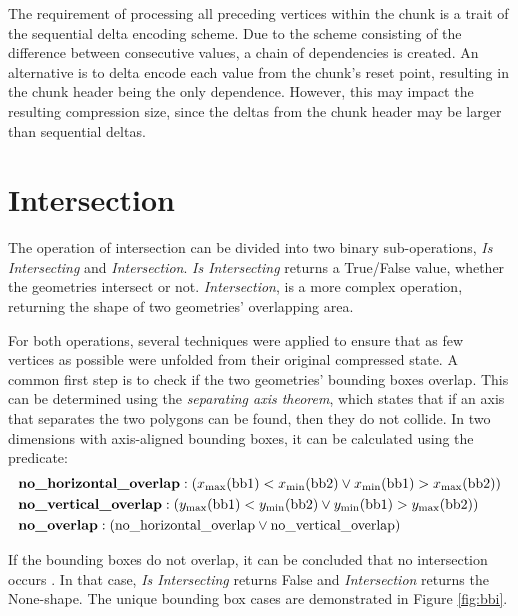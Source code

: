 The requirement of processing all preceding vertices within the chunk is a trait of the sequential delta encoding scheme. Due to the scheme consisting of the difference between consecutive values, a chain of dependencies is created. An alternative is to delta encode each value from the chunk's reset point, resulting in the chunk header being the only dependence. However, this may impact the resulting compression size, since the deltas from the chunk header may be larger than sequential deltas.

\section{Intersection}
\label{sec:intersection}
The operation of intersection can be divided into two binary sub-operations, \textit{Is Intersecting} and \textit{Intersection}. \textit{Is Intersecting} returns a True/False value, whether the geometries intersect or not. \textit{Intersection}, is a more complex operation, returning the shape of two geometries' overlapping area.

For both operations, several techniques were applied to ensure that as few vertices as possible were unfolded from their original compressed state. A common first step is to check if the two geometries' bounding boxes overlap. This can be determined using the \textit{separating axis theorem}, which states that if an axis that separates the two polygons can be found, then they do not collide. In two dimensions with axis-aligned bounding boxes, it can be calculated using the predicate: 
\begin{align*}
&\text{\textbf{no\_horizontal\_overlap}} : (x_{\text{max}}(\text{bb1}) < x_{\text{min}}(\text{bb2}) \lor x_{\text{min}}(\text{bb1}) > x_{\text{max}}(\text{bb2})) \\
&\text{\textbf{no\_vertical\_overlap}} : (y_{\text{max}}(\text{bb1}) < y_{\text{min}}(\text{bb2}) \lor y_{\text{min}}(\text{bb1}) > y_{\text{max}}(\text{bb2})) \\
&\text{\textbf{no\_overlap}} : (\text{no\_horizontal\_overlap} \lor \text{no\_vertical\_overlap})
\end{align*}


If the bounding boxes do not overlap, it can be concluded that no 
 intersection occurs \cite{SAT}. In that case, \textit{Is Intersecting} returns False and \textit{Intersection} returns the None-shape. The unique bounding box cases are demonstrated in Figure \ref{fig:bbi}. 

